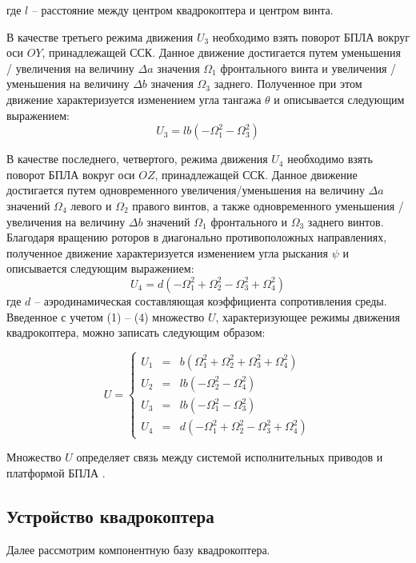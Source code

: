где \(l\) -- расстояние между центром квадрокоптера и центром винта.

В качестве третьего режима движения \(U_{3}\) необходимо взять поворот БПЛА вокруг оси \(OY\), принадлежащей ССК. Данное движение достигается путем уменьшения / увеличения на величину \(\Delta a\) значения \(\Omega_{1}\) фронтального винта и увеличения / уменьшения на величину \(\Delta b\) значения \(\Omega_{3}\) заднего. Полученное при этом движение характеризуется изменением угла тангажа \(\theta\) и описывается следующим выражением:
\begin{equation}
U_{3}=lb(-\Omega_{1}^2-\Omega_{3}^2)
\end{equation}

В качестве последнего, четвертого, режима движения \(U_{4}\) необходимо взять поворот БПЛА вокруг оси \(OZ\), принадлежащей ССК. Данное движение достигается путем одновременного увеличения/уменьшения на величину \(\Delta a\) значений \(\Omega_{4}\) левого и \(\Omega_{2}\) правого винтов, а также одновременного уменьшения / увеличения на величину \(\Delta b\) значений \(\Omega_{1}\) фронтального и \(\Omega_{3}\) заднего винтов. Благодаря вращению роторов в диагонально противоположных направлениях, полученное движение характеризуется изменением угла рыскания \(\psi\) и описывается следующим выражением:
\begin{equation}
U_{4}=d(-\Omega_{1}^2+\Omega_{2}^2-\Omega_{3}^2+\Omega_{4}^2)
\end{equation}
где \(d\) -- аэродинамическая составляющая коэффициента сопротивления среды.
Введенное с учетом (1) -- (4) множество \(U\), характеризующее режимы
движения квадрокоптера, можно записать следующим образом:

\begin{equation}
U = \left\{ \begin{aligned}
U_{1}&=&b(\Omega_{1}^2+\Omega_{2}^2+\Omega_{3}^2+\Omega_{4}^2)\\
U_{2}&=&lb(-\Omega_{2}^2-\Omega_{4}^2)\\
U_{3}&=&lb(-\Omega_{1}^2-\Omega_{3}^2)\\
U_{4}&=&d(-\Omega_{1}^2+\Omega_{2}^2-\Omega_{3}^2+\Omega_{4}^2)
\end{aligned} \right.
\end{equation}

Множество \(U\) определяет связь между системой исполнительных приводов и платформой БПЛА \cite{mathmodel}.

\subsection{Устройство квадрокоптера}
Далее рассмотрим компонентную базу квадрокоптера.

